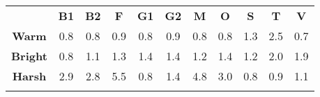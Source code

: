 \begin{tabular}{|c||c|c|c|c|c|c|c|c|c|c|}
	\cline{2-11}
	\multicolumn{1}{c|}{} & \bf{B1} & \bf{B2} & \bf{F} & \bf{G1} & \bf{G2} & \bf{M} & \bf{O} & \bf{S} & \bf{T} & \bf{V} \tabularnewline
	\hhline{~|-|-|-|-|-|-|-|-|-|-|}
	\noalign{\vspace{\doublerulesep}}
	\hhline{-||-|-|-|-|-|-|-|-|-|-|}
	\bf{Warm} & 0.8 & 0.8 & 0.9 & 0.8 & 0.9 & 0.8 & 0.8 & 1.3 & 2.5 & 0.7 \tabularnewline
	\hhline{-||-|-|-|-|-|-|-|-|-|-|}
	\bf{Bright} & 0.8 & 1.1 & 1.3 & 1.4 & 1.4 & 1.2 & 1.4 & 1.2 & 2.0 & 1.9 \tabularnewline
	\hhline{-||-|-|-|-|-|-|-|-|-|-|}
	\bf{Harsh} & 2.9 & 2.8 & 5.5 & 0.8 & 1.4 & 4.8 & 3.0 & 0.8 & 0.9 & 1.1 \tabularnewline
	\hhline{-||-|-|-|-|-|-|-|-|-|-|}
\end{tabular}

